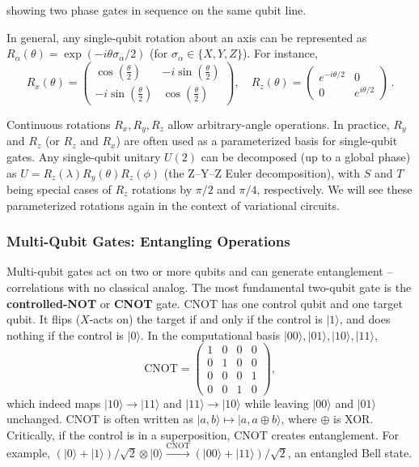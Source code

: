 \noindent showing two phase gates in sequence on the same qubit line.\cite{QuantikzDocs}

In general, any single-qubit rotation about an axis can be represented as $R_\alpha(\theta)=\exp(-i\theta \sigma_\alpha/2)$ (for $\sigma_\alpha \in \{X,Y,Z\}$).\cite{NielsenChuang2010} For instance,
$$
R_x(\theta)=\begin{pmatrix}\cos(\tfrac{\theta}{2}) & -i\sin(\tfrac{\theta}{2})\\[6pt]-i\sin(\tfrac{\theta}{2}) & \cos(\tfrac{\theta}{2})\end{pmatrix},\quad
R_z(\theta)=\begin{pmatrix}e^{-i\theta/2} & 0\\[6pt]0 & e^{i\theta/2}\end{pmatrix}\, .
$$

Continuous rotations $R_x, R_y, R_z$ allow arbitrary-angle operations.\cite{NielsenChuang2010} In practice, $R_y$ and $R_z$ (or $R_z$ and $R_x$) are often used as a parameterized basis for single-qubit gates.\cite{Kandala2017hardware} Any single-qubit unitary $U(2)$ can be decomposed (up to a global phase) as $U = R_z(\lambda) R_y(\theta) R_z(\phi)$ (the Z–Y–Z Euler decomposition), with $S$ and $T$ being special cases of $R_z$ rotations by $\pi/2$ and $\pi/4$, respectively.\cite{NielsenChuang2010} We will see these parameterized rotations again in the context of variational circuits.

\subsubsection*{Multi-Qubit Gates: Entangling Operations}

Multi-qubit gates act on two or more qubits and can generate entanglement – correlations with no classical analog.\cite{Bell1964} The most fundamental two-qubit gate is the \textbf{controlled-NOT} or \textbf{CNOT} gate.\cite{Barenco1995elementary} CNOT has one control qubit and one target qubit. It flips ($X$-acts on) the target if and only if the control is $|1\rangle$, and does nothing if the control is $|0\rangle$.\cite{NielsenChuang2010} In the computational basis ${|00\rangle,|01\rangle,|10\rangle,|11\rangle}$,
$$
\mathrm{CNOT}=\begin{pmatrix}1&0&0&0\\0&1&0&0\\0&0&0&1\\0&0&1&0\end{pmatrix},
$$
which indeed maps $|10\rangle\!\to\!|11\rangle$ and $|11\rangle\!\to\!|10\rangle$ while leaving $|00\rangle$ and $|01\rangle$ unchanged.\cite{NielsenChuang2010} CNOT is often written as $|a,b\rangle\!\mapsto\!|a,a\oplus b\rangle$, where $\oplus$ is XOR.\cite{Barenco1995elementary} Critically, if the control is in a superposition, CNOT creates entanglement.\cite{Bell1964} For example, $(|0\rangle+|1\rangle)/\sqrt2\otimes|0\rangle \xrightarrow{\mathrm{CNOT}}(|00\rangle+|11\rangle)/\sqrt2$, an entangled Bell state.\cite{Bell1964}

